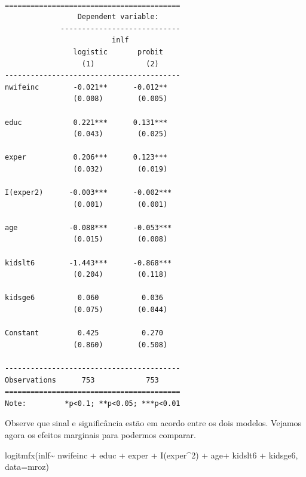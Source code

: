 \documentclass[
  letterpaper,
  DIV=11,
  numbers=noendperiod]{scrreprt}
\newenvironment{Shaded}{\begin{snugshade}}{\end{snugshade}}
\newcommand{\AttributeTok}[1]{\textcolor[rgb]{0.40,0.45,0.13}{#1}}
\newcommand{\DecValTok}[1]{\textcolor[rgb]{0.68,0.00,0.00}{#1}}
\newcommand{\FunctionTok}[1]{\textcolor[rgb]{0.28,0.35,0.67}{#1}}
\newcommand{\NormalTok}[1]{\textcolor[rgb]{0.00,0.23,0.31}{#1}}
\newcommand{\SpecialCharTok}[1]{\textcolor[rgb]{0.37,0.37,0.37}{#1}}
\begin{document}
\begin{verbatim}

=========================================
                 Dependent variable:     
             ----------------------------
                         inlf            
                logistic       probit    
                  (1)            (2)     
-----------------------------------------
nwifeinc        -0.021**      -0.012**   
                (0.008)        (0.005)   
                                         
educ            0.221***      0.131***   
                (0.043)        (0.025)   
                                         
exper           0.206***      0.123***   
                (0.032)        (0.019)   
                                         
I(exper2)      -0.003***      -0.002***  
                (0.001)        (0.001)   
                                         
age            -0.088***      -0.053***  
                (0.015)        (0.008)   
                                         
kidslt6        -1.443***      -0.868***  
                (0.204)        (0.118)   
                                         
kidsge6          0.060          0.036    
                (0.075)        (0.044)   
                                         
Constant         0.425          0.270    
                (0.860)        (0.508)   
                                         
-----------------------------------------
Observations      753            753     
=========================================
Note:         *p<0.1; **p<0.05; ***p<0.01
\end{verbatim}

Observe que sinal e significância estão em acordo entre os dois modelos.
Vejamos agora os efeitos marginais para podermos comparar.

\begin{Shaded}
\begin{Highlighting}[]
\FunctionTok{logitmfx}\NormalTok{(inlf}\SpecialCharTok{\textasciitilde{}}\NormalTok{ nwifeinc }\SpecialCharTok{+}\NormalTok{ educ }\SpecialCharTok{+}\NormalTok{ exper }\SpecialCharTok{+} \FunctionTok{I}\NormalTok{(exper}\SpecialCharTok{\^{}}\DecValTok{2}\NormalTok{) }\SpecialCharTok{+} 
\NormalTok{                  age}\SpecialCharTok{+}\NormalTok{ kidslt6 }\SpecialCharTok{+}\NormalTok{ kidsge6, }\AttributeTok{data=}\NormalTok{mroz)}
\end{Highlighting}
\end{Shaded}
\end{document}
